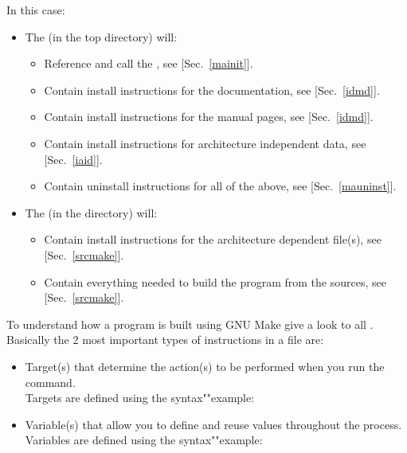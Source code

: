 In this case:
\begin{itemize}
\item The  (in the top directory) will:
\begin{itemize}
\item Reference and call the , see [Sec.~\ref{mainit}].
\item Contain install instructions for the documentation, see [Sec.~\ref{idmd}].
\item Contain install instructions for the manual pages, see [Sec.~\ref{idmd}].
\item Contain install instructions for architecture independent data, see [Sec.~\ref{iaid}].
\item Contain uninstall instructions for all of the above, see [Sec.~\ref{mauninst}].
\end{itemize}
\item The  (in the  directory) will:
\begin{itemize}
\item Contain install instructions for the architecture dependent file(s), see [Sec.~\ref{srcmake}].
\item Contain everything needed to build the program from the sources, see [Sec.~\ref{srcmake}].
\end{itemize}
\end{itemize}
To understand how a program is built using GNU Make give a look to all . \\[0.25cm]
Basically the 2 most important types of instructions in a  file are:
\begin{itemize}
\item Target(s) that determine the action(s) to be performed when you run the  command. \\
Targets are defined using the syntax\quad "\rtt{:}"\quad example:
\begin{scripti}
\end{scripti}
\item Variable(s) that allow you to define and reuse values throughout the process. \\
Variables are defined using the syntax\quad""\quad example:
\begin{scripti}
\end{scripti}
\end{itemize}

\clearpage
